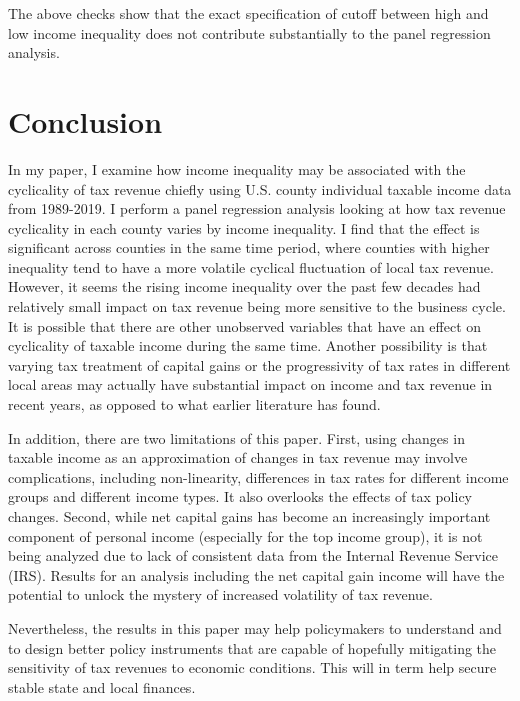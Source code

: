 \documentclass{article}
\begin{document}
The above checks show that the exact specification of cutoff between high and low income inequality does not contribute substantially to the panel regression analysis. 






\pagebreak
\section{Conclusion}

In my paper, I examine how income inequality may be associated with the cyclicality of tax revenue chiefly using U.S. county individual taxable income data from 1989-2019. I perform a panel regression analysis looking at how tax revenue cyclicality in each county varies by income inequality. I find that the effect is significant across counties in the same time period, where counties with higher inequality tend to have a more volatile cyclical fluctuation of local tax revenue. However, it seems the rising income inequality over the past few decades had relatively small impact on tax revenue being more sensitive to the business cycle. It is possible that there are other unobserved variables that have an effect on cyclicality of taxable income during the same time. Another possibility is that varying tax treatment of capital gains or the progressivity of tax rates in different local areas may actually have substantial impact on income and tax revenue in recent years, as opposed to what earlier literature has found. 

In addition, there are two limitations of this paper. First, using changes in taxable income as an approximation of changes in tax revenue may involve complications, including non-linearity, differences in tax rates for different income groups and different income types. It also overlooks the effects of tax policy changes. Second, while net capital gains has become an increasingly important component of personal income (especially for the top income group), it is not being analyzed due to lack of consistent data from the Internal Revenue Service (IRS). Results for an analysis including the net capital gain income will have the potential to unlock the mystery of increased volatility of tax revenue. 

Nevertheless, the results in this paper may help policymakers to understand and to design better policy instruments that are capable of hopefully mitigating the sensitivity of tax revenues to economic conditions. This will in term help secure stable state and local finances. 
\end{document}
